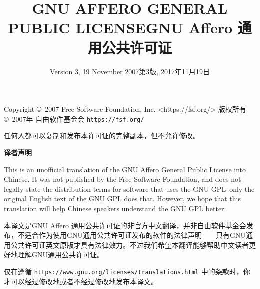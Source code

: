 \documentclass[11pt]{article}
\title{GNU AFFERO GENERAL PUBLIC LICENSE}
\title{GNU Affero 通用公共许可证}
\date{Version 3, 19 November 2007}
\date{第3版, 2017年11月19日}
\begin{document}
\maketitle

\begin{center}
{\parindent 0in

Copyright \copyright\ 2007 Free Software Foundation, Inc. <https://fsf.org/>
版权所有 \copyright\  2007年 自由软件基金会 \texttt{https://fsf.org/}

\bigskip
任何人都可以复制和发布本许可证的完整副本，但不允许修改。}

\end{center}

\begin{center}
  {\bf\large 译者声明}
\end{center}

This is an unofficial translation of the GNU Affero General Public License into Chinese. It was not published by the Free Software Foundation, and does not legally state the distribution terms for software that uses the GNU GPL--only the original English text of the GNU GPL does that. However, we hope that this translation will help Chinese speakers understand the GNU GPL better.

本译文是GNU Affero 通用公共许可证的非官方中文翻译，并非自由软件基金会发布，不适合作为使用GNU通用公共许可证发布的软件的法律声明——只有GNU通用公共许可证英文原版才具有法律效力。不过我们希望本翻译能够帮助中文读者更好地理解GNU通用公共许可证。

仅在遵循 \texttt{https://www.gnu.org/licenses/translations.html} 中的条款时，你才可以经过修改地或者不经过修改地发布本译文。

\pagebreak
\end{document}
